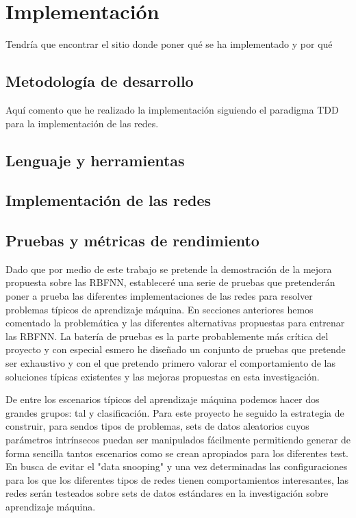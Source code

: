 \documentclass[10pt,a4paper, twocolumn]{report}
\begin{document}
\chapter{Implementación}
Tendría que encontrar el sitio donde poner qué se ha implementado y por qué
\section{Metodología de desarrollo}
Aquí comento que he realizado la implementación siguiendo el paradigma TDD para la implementación de las redes.
\section{Lenguaje y herramientas}
\section{Implementación de las redes}
\section{Pruebas y métricas de rendimiento}
Dado que por medio de este trabajo se pretende la demostración de la mejora propuesta sobre las RBFNN, estableceré una serie de pruebas que pretenderán poner a prueba las diferentes implementaciones de las redes para resolver problemas típicos de aprendizaje máquina.
En secciones anteriores hemos comentado la problemática y las diferentes alternativas propuestas para entrenar las RBFNN. La batería de pruebas es la parte probablemente más crítica del proyecto y con especial esmero he diseñado un conjunto de pruebas que pretende ser exhaustivo y con el que pretendo primero valorar el comportamiento de las soluciones típicas existentes y las mejoras propuestas en esta investigación.

De entre los escenarios típicos del aprendizaje máquina podemos hacer dos grandes grupos: tal y clasificación. Para este proyecto he seguido la estrategia de construir, para sendos tipos de problemas, sets de datos aleatorios cuyos parámetros intrínsecos puedan ser manipulados fácilmente permitiendo generar de forma sencilla tantos escenarios como se crean apropiados para los diferentes test. En busca de evitar el "data snooping" y una vez determinadas las configuraciones para los que los diferentes tipos de redes tienen comportamientos interesantes, las redes serán testeados sobre sets de datos estándares en la investigación sobre aprendizaje máquina.
\end{document}
